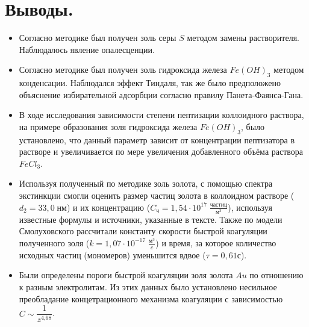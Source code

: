 \documentclass[a4paper, 11pt]{article}%
\begin{document}
    \section{Выводы.}
    \begin{itemize}
        \item Согласно методике был получен золь серы $S$ методом замены растворителя. Наблюдалось явление опалесценции.
        \item Согласно методике был получен золь гидроксида железа $Fe(OH)_3$ методом конденсации. Наблюдался эффект Тиндаля, так же было предположено объяснение избирательной адсорбции согласно правилу Панета-Фаянса-Гана.
        \item В ходе исследования зависимости степени пептизации коллоидного раствора, на примере образования золя гидроксида железа $Fe(OH)_3$, было установлено, что данный параметр зависит от концентрации пептизатора в растворе и увеличивается по мере увеличения добавленного объёма раствора $FeCl_3$.
        \item Используя полученный по методике золь золота, с помощью спектра экстинкции смогли оценить размер частиц золота в коллоидном растворе ($d_2 = 33,0 \; \text{нм}$) и их концентрацию ($C_{\text{ч}} = 1,54 \cdot 10^{17} \; \frac{\text{частиц}}{\text{м}^3}$), используя известные формулы и источники, указанные в тексте. Также по модели Смолуховского рассчитали константу скорости быстрой коагуляции полученного золя ($k = 1,07 \cdot 10^{-17} \; \frac{\text{м}^3}{c}$) и время, за которое количество исходных частиц (мономеров) уменьшится вдвое ($\tau = 0,61 \text{с}$).
        \item Были определены пороги быстрой коагуляции золя золота $Au$ по отношению к разным электролитам. Из этих данных было установлено несильное преобладание концетрационного механизма коагуляции с зависимостью $C \sim \dfrac{1}{z^\text{4,68}}$.
    \end{itemize}
\end{document}
